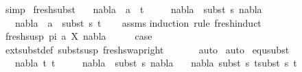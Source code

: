 \begin{isabellebody}
\ simp%
\endisatagproof
{\isafoldproof}%
%
\isadelimproof
\isanewline
%
\endisadelimproof
\isanewline
{}\isamarkupfalse%
\ fresh{\isacharunderscore}{\kern0pt}subst{\isacharcolon}{\kern0pt}\isanewline
\ \ \ {\isachardoublequoteopen}nabla{}\ {\isasymturnstile}\ a\ {\isasymsharp}\ t{\isachardoublequoteclose}\isanewline
\ \ \ \ \ {\isachardoublequoteopen}nabla{}\ {\isasymTurnstile}\ {\isacharparenleft}{\kern0pt}subst\ s{\isacharparenright}{\kern0pt}\ nabla{}{\isachardoublequoteclose}\isanewline
\ \ \ {\isachardoublequoteopen}nabla{}\ {\isasymturnstile}\ a\ {\isasymsharp}\ subst\ s\ t{\isachardoublequoteclose}\isanewline
%
\isadelimproof
\ \ %
\endisadelimproof
%
\isatagproof
{}\isamarkupfalse%
\ assms\isanewline
{}\isamarkupfalse%
{\isacharparenleft}{\kern0pt}induction\ rule{\isacharcolon}{\kern0pt}\ fresh{\isachardot}{\kern0pt}induct{\isacharparenright}{\kern0pt}\isanewline
\ \ \isamarkupfalse%
\ {\isacharparenleft}{\kern0pt}fresh{\isacharunderscore}{\kern0pt}susp\ pi\ a\ X\ nabla{\isacharparenright}{\kern0pt}\isanewline
\ \ \isamarkupfalse%
\ \isamarkupfalse%
\ {\isacharquery}{\kern0pt}case\ \isanewline
\ \ \ \ \isamarkupfalse%
\ ext{\isacharunderscore}{\kern0pt}subst{\isacharunderscore}{\kern0pt}def\ subst{\isacharunderscore}{\kern0pt}susp\ fresh{\isacharunderscore}{\kern0pt}swap{\isacharunderscore}{\kern0pt}right\ \isanewline
\ \ \ \ \isamarkupfalse%
\ auto\isanewline
{}\isamarkupfalse%
\ {\isacharparenleft}{\kern0pt}auto{\isacharparenright}{\kern0pt}%
\endisatagproof
{\isafoldproof}%
%
\isadelimproof
\isanewline
%
\endisadelimproof
\isanewline
{}\isamarkupfalse%
\ equ{\isacharunderscore}{\kern0pt}subst{\isacharcolon}{\kern0pt}\isanewline
\ \ \ {\isachardoublequoteopen}nabla{}{\isasymturnstile}\ t{}\ {\isasymapprox}t{}{\isachardoublequoteclose}\isanewline
\ \ \ \ \ {\isachardoublequoteopen}nabla{}\ {\isasymTurnstile}\ {\isacharparenleft}{\kern0pt}subst\ s{\isacharparenright}{\kern0pt}\ nabla{}{\isachardoublequoteclose}\isanewline
\ \ \ {\isachardoublequoteopen}nabla{}\ {\isasymturnstile}{\isacharparenleft}{\kern0pt}subst\ s\ t{}{\isacharparenright}{\kern0pt}{\isasymapprox}{\isacharparenleft}{\kern0pt}subst\ s\ t{}{\isacharparenright}{\kern0pt}{\isachardoublequoteclose}\isanewline

\end{isabellebody}
